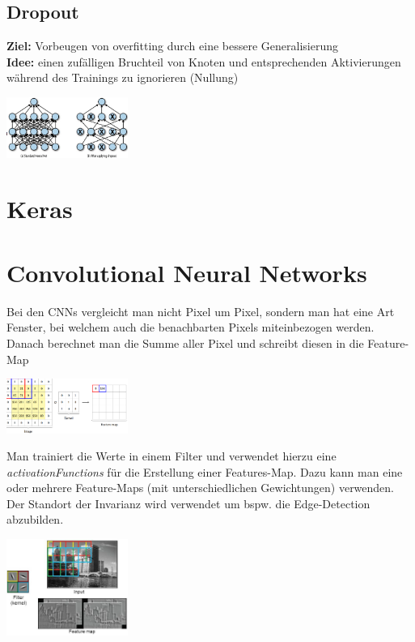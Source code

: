 \documentclass{article}
\newenvironment{Figure}
	{\par\medskip\noindent\minipage{\linewidth}}
	{\endminipage\par\medskip}
\theoremstyle{merke}
\theoremstyle{definition}
\begin{document}
        \subsection{Dropout}
        \textbf{Ziel:} Vorbeugen von overfitting durch eine bessere Generalisierung\\
        \textbf{Idee:} einen zufälligen Bruchteil von Knoten und entsprechenden Aktivierungen während des Trainings zu ignorieren (Nullung)
        \begin{Figure}
        \centering
        \includegraphics[width=150px]{img/DropoutRegularization.png}
            \label{fig:Vor und nach dem Dropout}
        \end{Figure}

    \section{Keras}


    \section{Convolutional Neural Networks}
    Bei den CNNs vergleicht man nicht Pixel um Pixel, sondern man hat eine Art Fenster, bei welchem auch die benachbarten Pixels miteinbezogen werden. 
    Danach berechnet man die Summe aller Pixel und schreibt diesen in die Feature-Map
    \begin{Figure}
    \centering
    \includegraphics[width=150px]{img/CNN.png}
        \label{fig:Abbildung eines CNNs}
    \end{Figure}

    Man trainiert die Werte in einem Filter und verwendet hierzu eine \textit{activationFunctions} für die Erstellung einer Features-Map. Dazu kann man eine oder mehrere Feature-Maps (mit unterschiedlichen Gewichtungen) verwenden.
    Der Standort der Invarianz wird verwendet um bspw. die Edge-Detection abzubilden. 
    \begin{Figure}
    \centering
    \includegraphics[width=150px]{img/CNNEdgeDetection.png}
        \label{fig:Abbildung eines CNNs mit Edge Detection}
    \end{Figure}
\end{document}
